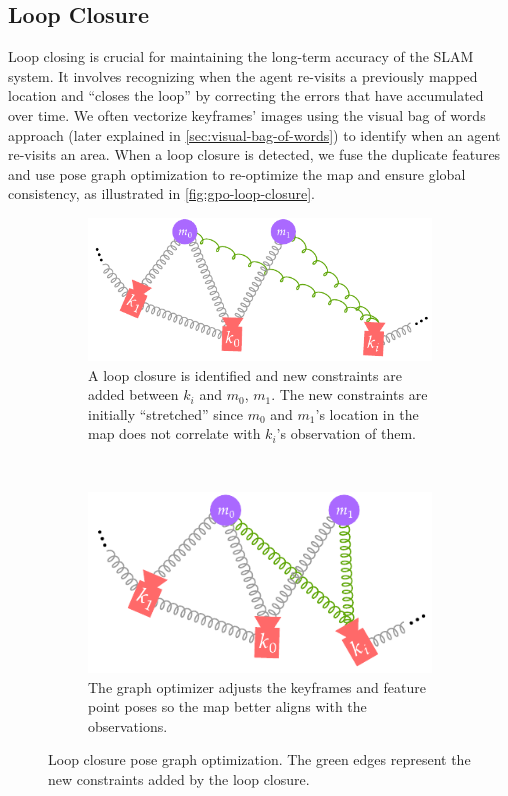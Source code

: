 \subsection{Loop Closure}
\label{sec:visual-slam-loop-closure}
Loop closing is crucial for maintaining the long-term accuracy of the SLAM system. It involves recognizing when the agent re-visits a previously mapped location and ``closes the loop'' by correcting the errors that have accumulated over time. We often vectorize keyframes' images using the visual bag of words approach (later explained in \autoref{sec:visual-bag-of-words}) to identify when an agent re-visits an area. When a loop closure is detected, we fuse the duplicate features and use pose graph optimization to re-optimize the map and ensure global consistency, as illustrated in \autoref{fig:gpo-loop-closure}.

\begin{figure}[h]
    \centering
    \begin{subfigure}[t]{0.54\textwidth}
        \centering
        \includegraphics[width=\textwidth]{figures/gpo_loop_closure_1.pdf}
        \caption{A loop closure is identified and new constraints are added between $k_i$ and $m_0$, $m_1$. The new constraints are initially ``stretched'' since $m_0$ and $m_1$'s location in the map does not correlate with $k_i$'s observation of them.}
    \end{subfigure}\hfill%
    ~
    \begin{subfigure}[t]{0.43\textwidth}
        \centering
        \includegraphics[width=\textwidth]{figures/gpo_loop_closure_2.pdf}
        \caption{The graph optimizer adjusts the keyframes and feature point poses so the map better aligns with the observations.}
    \end{subfigure}%
    \caption{Loop closure pose graph optimization. The green edges represent the new constraints added by the loop closure.}
    \label{fig:gpo-loop-closure}
\end{figure}


